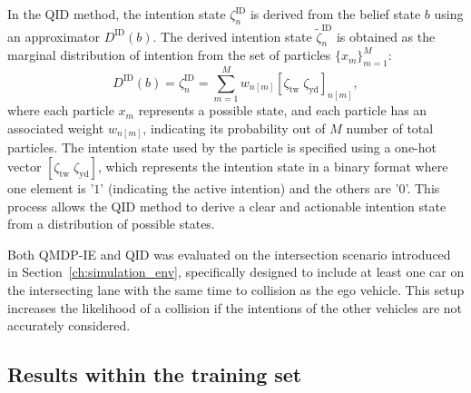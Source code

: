 In the QID method, the intention state $\zeta^\mathrm{ID}_n$ is derived from the belief state $b$ using an approximator $D^\mathrm{ID}(b)$. The derived intention state $\tilde{\zeta}^\mathrm{ID}_n$ is obtained as the marginal distribution of intention from the set of particles $\{ x_m \}^M_{m=1}$: 
\begin{equation}
    D^\mathrm{ID}(b) = \zeta^\mathrm{ID}_n = \sum_{m=1}^M w_{n[m]} [\zeta_\text{tw} \; \zeta_\text{yd}]_{n[m]},
    \label{eq:ID_i}
\end{equation}
where each particle $x_m$ represents a possible state, and each particle has an associated weight $w_{n[m]}$, indicating its probability out of $M$ number of total particles.
The intention state used by the particle is specified using a one-hot vector $[\zeta_\text{tw} \; \zeta_\text{yd}]$, which represents the intention state in a binary format where one element is '$1$' (indicating the active intention) and the others are '$0$'. This process allows the QID method to derive a clear and actionable intention state from a distribution of possible states.

Both QMDP-IE and QID was evaluated on the intersection scenario introduced in Section~\ref{ch:simulation_env}, specifically designed to include at least one car on the intersecting lane with the same time to collision as the ego vehicle. This setup increases the likelihood of a collision if the intentions of the other vehicles are not accurately considered.

\subsection{Results within the training set}

